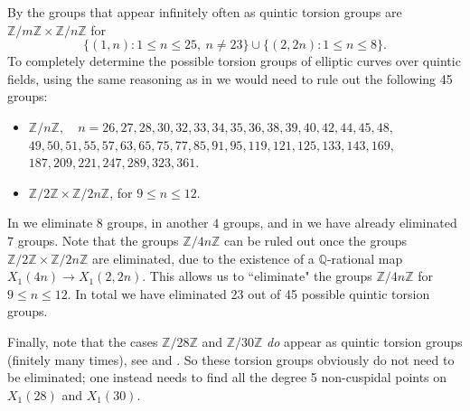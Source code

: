 \documentclass[11pt,reqno]{amsart}
\theoremstyle{definition}
\numberwithin{equation}{section}
\newcommand{\Q}{\mathbb{Q}}
\newcommand{\Z}{\mathbb{Z}}
\def\torz#1{\mathbb Z /#1 \mathbb Z}
\def\tg#1#2{\mathbb Z/#1\mathbb Z \times \mathbb Z /#2 \mathbb Z}
\begin{document}
By \cite[Theorem 1.1.]{DerickxSutherland} the groups that appear infinitely often as quintic torsion groups are $\tg{m}{n}$ for 
\begin{equation}
    \{(1,n): 1\leq n\leq 25,\ n \neq 23 \} \cup \{(2,2n): 1\leq n\leq 8\}.
\end{equation}
To completely determine the possible torsion groups of elliptic curves over quintic fields, using the same reasoning as in  we would need to rule out the following 45 groups: 
\begin{itemize}


\item $\Z/n\Z, \quad n =  26, 27, 28, 30, 32, 33, 34, 35, 36, 38, 39, 40, 42, 44, 45, 48,$\\ $ 49, 50, 51,
55, 57, 63, 65, 75, 77, 85, 91, 95, 119, 121, 125, 133, 143, 169,$\\ $ 187,209, 221, 247, 289, 323, 361.$
\item $\tg{2}{2n}$, for $9\leq n\leq 12.$
\end{itemize}
 In  we eliminate $8$ groups, in  another $4$ groups, and in  we have already eliminated $7$ groups. Note that the groups $\torz{4n}$ can be ruled out once the groups $\tg{2}{2n}$ are eliminated, due to the existence of a $\Q$-rational map $X_1(4n) \to X_1(2,2n)$. This allows us to ``eliminate" the groups $\torz{4n}$ for $9\leq n\leq 12.$ In total we have eliminated 23 out of 45 possible quintic torsion groups. 
 
 Finally, note that the cases $\torz{28}$ and $\torz{30}$ \textit{do} appear as quintic torsion groups (finitely many times), see \cite{vanHoeij} and . So these torsion groups obviously do not need to be eliminated; one instead needs to find all the degree 5 non-cuspidal points on $X_1(28)$ and $X_1(30)$.
\end{document}
